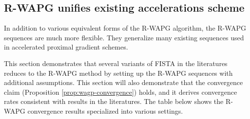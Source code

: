 \documentclass[12pt]{article}
\begin{document}
    

    \subsection{R-WAPG unifies existing accelerations scheme}\label{sec:rwapg-literatures}
        In addition to various equivalent forms of the R-WAPG algorithm, the R-WAPG sequences are much more flexible. 
        They generalize many existing sequences used in accelerated proximal gradient schemes. 
        \par
        This section demonstrates that several variants of FISTA in the literatures reduces to the R-WAPG method by setting up the R-WAPG sequences with additional assumptions. 
        This section will also demonstrate that the convergence claim (Proposition \ref{prop:wagp-convergence}) holds, and it derives convergence rates consistent with results in the literatures.  
        The table below shows the R-WAPG convergence results specialized into various settings. 
\end{document}
